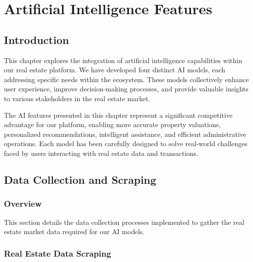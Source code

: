 \chapter{Artificial Intelligence Features}


\section*{Introduction}

This chapter explores the integration of artificial intelligence capabilities within our real estate platform. We have developed four distinct AI models, each addressing specific needs within the ecosystem. These models collectively enhance user experience, improve decision-making processes, and provide valuable insights to various stakeholders in the real estate market.

The AI features presented in this chapter represent a significant competitive advantage for our platform, enabling more accurate property valuations, personalized recommendations, intelligent assistance, and efficient administrative operations. Each model has been carefully designed to solve real-world challenges faced by users interacting with real estate data and transactions.

\section{Data Collection and Scraping}
\subsection{Overview}
This section details the data collection processes implemented to gather the real estate market data required for our AI models. 

\subsection{Real Estate Data Scraping}
